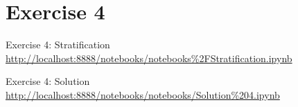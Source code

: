 \section{Exercise 4}

\begin{frame}{Exercise 4: Stratification}
    \centering
    \vfill
    \scriptsize{\url{http://localhost:8888/notebooks/notebooks\%2FStratification.ipynb}}
    \vfill
\end{frame}

\begin{frame}{Exercise 4: Solution}
    \centering
    \vfill
    \scriptsize{\url{http://localhost:8888/notebooks/notebooks/Solution\%204.ipynb}}
    \vfill
\end{frame}

